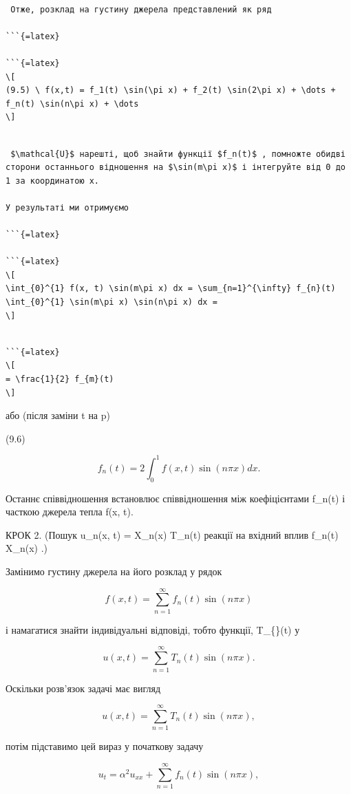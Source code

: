\documentclass[
  ukrainian,
]{article}
\begin{document}
\begin{verbatim}

 Отже, розклад на густину джерела представлений як ряд

```{=latex}

```{=latex}
\[
(9.5) \ f(x,t) = f_1(t) \sin(\pi x) + f_2(t) \sin(2\pi x) + \dots + f_n(t) \sin(n\pi x) + \dots
\]
\end{verbatim}

\begin{verbatim}

 $\mathcal{U}$ нарешті, щоб знайти функції $f_n(t)$ , помножте обидві сторони останнього відношення на $\sin(m\pi x)$ і інтегруйте від 0 до 1 за координатою x.

У результаті ми отримуємо

```{=latex}

```{=latex}
\[
\int_{0}^{1} f(x, t) \sin(m\pi x) dx = \sum_{n=1}^{\infty} f_{n}(t) \int_{0}^{1} \sin(m\pi x) \sin(n\pi x) dx =
\]
\end{verbatim}

\begin{verbatim}

```{=latex}
\[
= \frac{1}{2} f_{m}(t)
\]
\end{verbatim}

або (після заміни t на p)

(9.6)

\[
f_{n}(t) = 2 \int_{0}^{1} f(x, t) \sin(n\pi x) dx.
\]

Останнє співвідношення встановлює співвідношення між коефіцієнтами
f\_n(t) і часткою джерела тепла f(x, t).

КРОК 2. (Пошук u\_n(x, t) = X\_n(x) T\_n(t) реакції на вхідний вплив
f\_n(t) X\_n(x) .)

Замінимо густину джерела на його розклад у рядок

\[
f(x, t) = \sum_{n=1}^{\infty} f_n(t) \sin(n\pi x)
\]

і намагатися знайти індивідуальні відповіді, тобто функції,
T\_\{\}(t) у

\[
u(x, t) = \sum_{n=1}^{\infty} T_n(t) \sin(n\pi x).
\]

Оскільки розв'язок задачі має вигляд

\[
u(x, t) = \sum_{n=1}^{\infty} T_n(t) \sin(n\pi x),
\]

потім підставимо цей вираз у початкову задачу

\[
u_{t} = \alpha^{2} u_{xx} + \sum_{n=1}^{\infty} f_{n}(t) \sin(n\pi x),
\]
\end{document}
